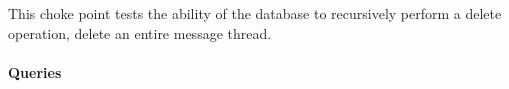 
This choke point tests the ability of the database to recursively perform a delete operation, \eg delete an entire message thread.


\paragraph{Queries}
{\raggedright
}